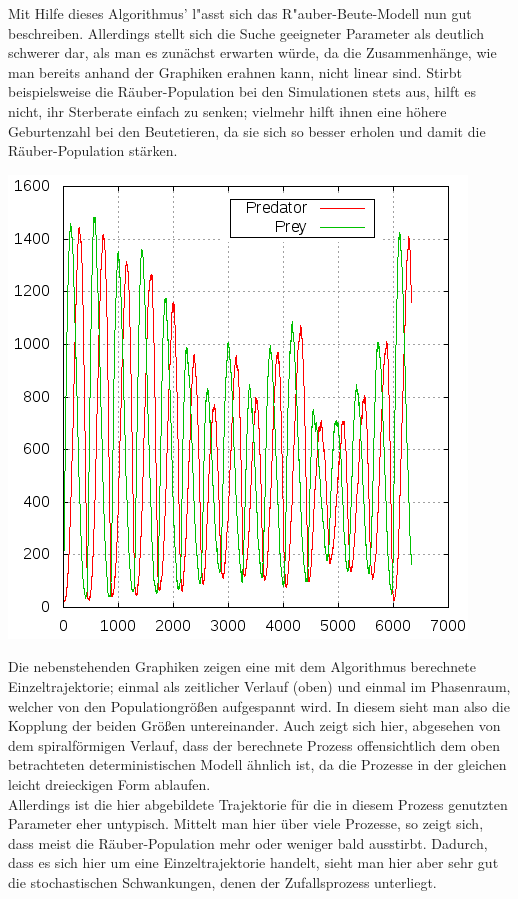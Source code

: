 \documentclass[11pt]{article}
\begin{document}
Mit Hilfe dieses Algorithmus' l"asst sich das R"auber-Beute-Modell nun gut beschreiben. Allerdings stellt sich die Suche geeigneter Parameter als deutlich schwerer dar, als man es zunächst erwarten würde, da die Zusammenhänge, wie man bereits anhand der Graphiken erahnen kann, nicht linear sind. Stirbt beispielsweise die Räuber-Population bei den Simulationen stets aus, hilft es nicht, ihr Sterberate einfach zu senken; vielmehr hilft ihnen eine höhere Geburtenzahl bei den Beutetieren, da sie sich so besser erholen und damit die Räuber-Population stärken.
\begin{minipage}[b]{0.6\textwidth} 
\includegraphics[width=\textwidth]{Graphiken/ppm1timepop.png}
\end{minipage}
\begin{minipage}[b]{0.4\textwidth}
Die nebenstehenden Graphiken zeigen eine mit dem Algorithmus berechnete Einzeltrajektorie; einmal als zeitlicher Verlauf (oben) und einmal im \glqq Phasenraum\grqq , welcher von den Populationgrößen aufgespannt wird. In diesem sieht man also die Kopplung der beiden Größen untereinander. 
Auch zeigt sich hier, abgesehen von dem spiralförmigen Verlauf, dass der berechnete Prozess offensichtlich dem oben betrachteten deterministischen Modell ähnlich ist, da die Prozesse in der gleichen leicht dreieckigen Form ablaufen.\\
Allerdings ist die hier abgebildete Trajektorie für die in diesem Prozess genutzten Parameter eher untypisch. Mittelt man hier über viele Prozesse, so zeigt sich, dass meist die Räuber-Population mehr oder weniger bald ausstirbt. Dadurch, dass es sich hier um eine Einzeltrajektorie handelt, sieht man hier aber sehr gut die stochastischen Schwankungen, denen der Zufallsprozess unterliegt.
\end{minipage}
\end{document}
